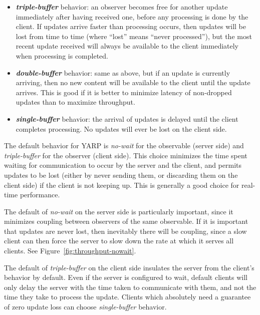 \begin{itemize} \pflist

\item \textbf{\textit{triple-buffer}} behavior: an observer becomes free for
another update immediately after having received one, before any
processing is done by the client.  If updates arrive faster than
processing occurs, then updates will be lost from time to time (where
``lost'' means ``never processed''), but the most recent update
received will always be available to the client immediately when processing
is completed.

\item \textbf{\textit{double-buffer}} behavior: same as above, but if
an update is currently arriving, then no new content will be available
to the client until the update arrives.  This is good if it is better
to minimize latency of non-dropped updates than to maximize
throughput.

\item \textbf{\textit{single-buffer}} behavior: the arrival of updates
is delayed until the client completes processing.  No updates will ever be 
lost on the client side.


\end{itemize}

\noindent The default behavior for YARP is \textit{no-wait} for
the observable (server side) and \textit{triple-buffer} for 
the observer (client side).  This
choice minimizes the time spent waiting for communication to occur by
the server and the client, and permits updates to be lost (either by
never sending them, or discarding them on the client side) if the
client is not keeping up.  This is generally a good choice for
real-time performance.

The default of \textit{no-wait} on the server side is particularly
important, since it minimizes coupling between observers of the same
observable.  If it is important that updates are never lost, then
inevitably there will be coupling, since a slow client can then force
the server to slow down the rate at which it serves all clients.
See Figure~\ref{fig:throughput-nowait}.

The default of \textit{triple-buffer} on the client side insulates the
server from the client's behavior by default.  Even if the server is
configured to wait, default clients will only delay the server
with the time taken to communicate with them, and not the time
they take to process the update.  Clients which absolutely
need a guarantee of zero update loss can choose \textit{single-buffer}
behavior.
%


